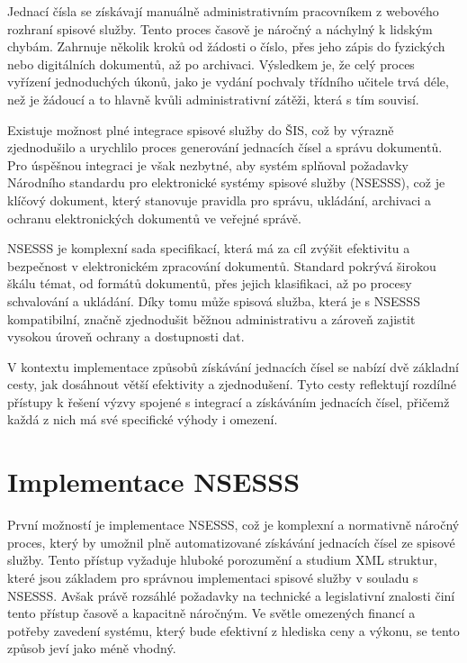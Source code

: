 Jednací čísla se získávají manuálně administrativním pracovníkem z webového rozhraní spisové služby. Tento proces časově je náročný a náchylný k lidským chybám. Zahrnuje několik kroků od žádosti o číslo, přes jeho zápis do fyzických nebo digitálních dokumentů, až po archivaci. Výsledkem je, že celý proces vyřízení jednoduchých úkonů, jako je vydání pochvaly třídního učitele trvá déle, než je žádoucí a to hlavně kvůli administrativní zátěži, která s tím souvisí.

Existuje možnost plné integrace spisové služby do ŠIS, což by výrazně zjednodušilo a urychlilo proces generování jednacích čísel a správu dokumentů. Pro úspěšnou integraci je však nezbytné, aby systém splňoval požadavky Národního standardu pro elektronické systémy spisové služby (NSESSS)\cite{nsesss}, což je klíčový dokument, který stanovuje pravidla pro správu, ukládání, archivaci a ochranu elektronických dokumentů ve veřejné správě.

NSESSS je komplexní sada specifikací, která má za cíl zvýšit efektivitu a bezpečnost v elektronickém zpracování dokumentů. Standard pokrývá širokou škálu témat, od formátů dokumentů, přes jejich klasifikaci, až po procesy schvalování a ukládání. Díky tomu může spisová služba, která je s NSESSS kompatibilní, značně zjednodušit běžnou administrativu a zároveň zajistit vysokou úroveň ochrany a dostupnosti dat.

V kontextu implementace způsobů získávání jednacích čísel se nabízí dvě základní cesty, jak dosáhnout větší efektivity a zjednodušení. Tyto cesty reflektují rozdílné přístupy k řešení výzvy spojené s integrací a získáváním jednacích čísel, přičemž každá z nich má své specifické výhody i omezení.

\section{Implementace NSESSS}
První možností je implementace NSESSS, což je komplexní a normativně náročný proces, který by umožnil plně automatizované získávání jednacích čísel ze spisové služby. Tento přístup vyžaduje hluboké porozumění a studium XML struktur, které jsou základem pro správnou implementaci spisové služby v souladu s NSESSS. Avšak právě rozsáhlé požadavky na technické a legislativní znalosti činí tento přístup časově a kapacitně náročným. Ve světle omezených financí a potřeby zavedení systému, který bude efektivní z hlediska ceny a výkonu, se tento způsob jeví jako méně vhodný.

